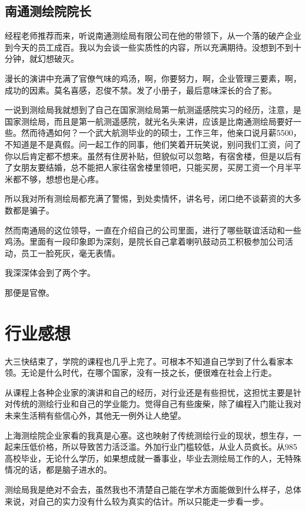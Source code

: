 \documentclass[a4paper,16pt]{article}
\begin{document}
    \subsection{南通测绘院院长}
    经程老师推荐而来，听说南通测绘局有限公司在他的带领下，从一个落的破产企业到今天的员工成百。我以为会谈一些实质性的内容，所以充满期待。没想到不到十分钟，就幻想破灭。
    
    漫长的演讲中充满了官僚气味的鸡汤，啊，你要努力，啊，企业管理三要素，啊，成功的因素。莫名喜感，忍俊不禁。发了小册子，最后意味深长的合了影。
    
    一说到测绘局我就想到了自己在国家测绘局第一航测遥感院实习的经历，注意，是国家测绘局，而且是第一航测遥感院，就光名头来讲，应该是比南通测绘局要好一些。然而待遇如何？一个武大航测毕业的的硕士，工作三年，他亲口说月薪5500，不知道是不是真假。问一起工作的同事，他们笑着开玩笑说，别问我们工资，问了你以后肯定都不想来。虽然有住房补贴，但貌似可以忽略，有宿舍楼，但是以后有了女朋友要结婚，总不能把人家往宿舍楼里领吧，只能买房，买房工资一个月半平米都不够，想想也是心疼。
    
    所以我对所有测绘局都充满了警惕，到处卖情怀，讲名号，闭口绝不谈薪资的大多数都是骗子。
    
    然而南通局的这位领导，一直在介绍自己的公司里面，进行了哪些联谊活动和一些鸡汤。里面有一段印象即为深刻，是院长自己拿着喇叭鼓动员工积极参加公司活动，员工一脸死灰，毫无表情。
    
    我深深体会到了两个字。
    
    那便是官僚。



    \section{行业感想}
    大三快结束了，学院的课程也几乎上完了。可根本不知道自己学到了什么看家本领。无论是什么时代，在哪个国家，没有一技之长，便很难在社会上行走。
    
    从课程上各种企业家的演讲和自己的经历，对行业还是有些担忧，这担忧主要是针对传统的测绘行业和自己的学业能力。觉得自己有些废柴，除了编程入门能让我对未来生活稍有些信心外，其他无一例外让人绝望。
    
    上海测绘院企业家看的我真是心塞。这也映射了传统测绘行业的现状，想生存，一起来压低价格，所以导致苦力活泛滥。外加行业门槛较低，从业人员疯长。从985高校毕业，无论什么学历，如果想成就一番事业，毕业去测绘局工作的人，无特殊情况的话，都是脑子进水的。
    
    测绘局我是绝对不会去，虽然我也不清楚自己能在学术方面能做到什么样子，总体来说，对自己的实力没有什么较为真实的估计。所以只能走一步看一步。
    
\end{document}
